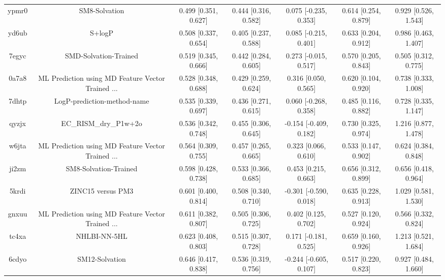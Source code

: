 \documentclass{article}
\begin{document}
\begin{center}
\begin{longtable}{|ccccccc|}
 ypmr0 &                                      SM8-Solvation &  0.499 [0.351, 0.627] &  0.444 [0.316, 0.582] &    0.075 [-0.235, 0.353] &  0.614 [0.254, 0.879] &    0.929 [0.526, 1.543] \\
 yd6ub &                                             S+logP &  0.508 [0.337, 0.654] &  0.405 [0.237, 0.588] &    0.085 [-0.215, 0.401] &  0.633 [0.204, 0.912] &    0.986 [0.463, 1.407] \\
 7egyc &                              SMD-Solvation-Trained &  0.519 [0.345, 0.666] &  0.442 [0.284, 0.605] &    0.273 [-0.015, 0.517] &  0.570 [0.205, 0.843] &    0.505 [0.312, 0.775] \\
 0a7a8 &  ML Prediction using MD Feature Vector Trained ... &  0.528 [0.348, 0.688] &  0.429 [0.259, 0.624] &     0.316 [0.050, 0.565] &  0.620 [0.104, 0.920] &    0.738 [0.333, 1.008] \\
 7dhtp &                        LogP-prediction-method-name &  0.535 [0.339, 0.697] &  0.436 [0.271, 0.615] &    0.060 [-0.268, 0.358] &  0.485 [0.116, 0.882] &    0.728 [0.335, 1.147] \\
 qyzjx &                              EC\_RISM\_dry\_P1w+2o &  0.536 [0.342, 0.748] &  0.455 [0.306, 0.645] &   -0.154 [-0.409, 0.182] &  0.730 [0.325, 0.974] &    1.216 [0.877, 1.478] \\
 w6jta &  ML Prediction using MD Feature Vector Trained ... &  0.564 [0.309, 0.755] &  0.457 [0.265, 0.665] &     0.323 [0.066, 0.610] &  0.533 [0.147, 0.902] &    0.624 [0.384, 0.848] \\
 ji2zm &                              SM8-Solvation-Trained &  0.598 [0.428, 0.738] &  0.533 [0.366, 0.685] &     0.453 [0.215, 0.663] &  0.656 [0.312, 0.899] &    0.656 [0.418, 0.964] \\
 5krdi &                                  ZINC15 versus PM3 &  0.601 [0.400, 0.814] &  0.508 [0.340, 0.710] &   -0.301 [-0.590, 0.018] &  0.635 [0.228, 0.913] &    1.029 [0.581, 1.530] \\
 gnxuu &  ML Prediction using MD Feature Vector Trained ... &  0.611 [0.382, 0.807] &  0.505 [0.306, 0.725] &     0.402 [0.125, 0.702] &  0.527 [0.120, 0.924] &    0.566 [0.332, 0.824] \\
 tc4xa &                                       NHLBI-NN-5HL &  0.623 [0.408, 0.803] &  0.515 [0.307, 0.728] &    0.171 [-0.181, 0.525] &  0.659 [0.160, 0.926] &    1.213 [0.521, 1.684] \\
 6cdyo &                                     SM12-Solvation &  0.646 [0.417, 0.838] &  0.536 [0.319, 0.756] &   -0.244 [-0.605, 0.107] &  0.517 [0.220, 0.823] &    0.927 [0.484, 1.660] \\

\end{longtable}
\end{center}
\end{document}
